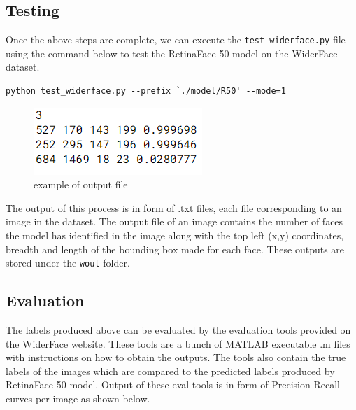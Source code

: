 \documentclass{article}
\begin{document}
\subsection{Testing}
Once the above steps are complete, we can execute the \texttt{test\_widerface.py} file using the command below to test the RetinaFace-50 model on the WiderFace dataset. 
\begin{verbatim}python test_widerface.py --prefix `./model/R50' --mode=1\end{verbatim} 
\begin{figure}
	\includegraphics{wout1.png}
	\caption{example of output file}
\end{figure}  
The output of this process is in form of .txt files, each file corresponding to an image in the dataset. The output file of an image contains the number of faces the model has identified in the image along with the top left (x,y) coordinates, breadth and length of the bounding box made for each face. These outputs are stored under the \texttt{wout} folder.

\subsection{Evaluation}
The labels produced above can be evaluated by the evaluation tools provided on the WiderFace website. These tools are a bunch of MATLAB executable .m files with instructions on how to obtain the outputs. The tools also contain the true labels of the images which are compared to the predicted labels produced by RetinaFace-50 model. Output of these eval tools is in form of Precision-Recall curves per image as shown below. 
\end{document}
